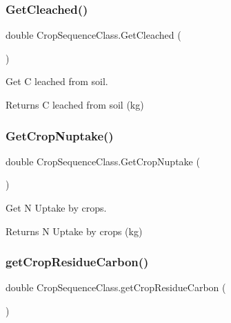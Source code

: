 \subsubsection{\texorpdfstring{GetCleached()}{GetCleached()}}
{\footnotesize\ttfamily double Crop\+Sequence\+Class.\+Get\+Cleached (\begin{DoxyParamCaption}{ }\end{DoxyParamCaption})\hspace{0.3cm}{\ttfamily [inline]}}



Get C leached from soil. 

\begin{DoxyReturn}{Returns}
C leached from soil (kg) 
\end{DoxyReturn}
\mbox{\label{class_crop_sequence_class_a92d2f8335cb4f16506d5087e0ab58622}} 
\subsubsection{\texorpdfstring{GetCropNuptake()}{GetCropNuptake()}}
{\footnotesize\ttfamily double Crop\+Sequence\+Class.\+Get\+Crop\+Nuptake (\begin{DoxyParamCaption}{ }\end{DoxyParamCaption})\hspace{0.3cm}{\ttfamily [inline]}}



Get N Uptake by crops. 

\begin{DoxyReturn}{Returns}
N Uptake by crops (kg) 
\end{DoxyReturn}
\mbox{\label{class_crop_sequence_class_aa75f44fa8e749c2f59010972c2956dc7}} 
\subsubsection{\texorpdfstring{getCropResidueCarbon()}{getCropResidueCarbon()}}
{\footnotesize\ttfamily double Crop\+Sequence\+Class.\+get\+Crop\+Residue\+Carbon (\begin{DoxyParamCaption}{ }\end{DoxyParamCaption})\hspace{0.3cm}{\ttfamily [inline]}}



